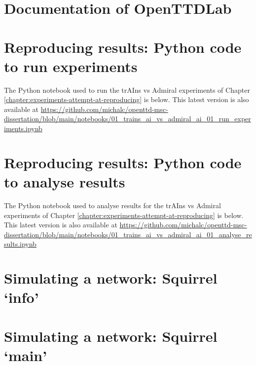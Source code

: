 \documentclass[logo,msc,dsti]{style/infthesis}    %
\begin{document}
{\chapter{Documentation of OpenTTDLab}
\label{chapter:openttdlab-documentation}



\chapter{Reproducing results: Python code to run experiments}
\label{chapter:trains-vs-admiral-run-experiments}

The Python notebook used to run the trAIns vs Admiral experiments of Chapter \ref{chapter:experiments-attempt-at-reproducing} is below. This latest version is also available at \url{https://github.com/michalc/openttd-msc-dissertation/blob/main/notebooks/01_trains_ai_vs_admiral_ai_01_run_experiments.ipynb}



\chapter{Reproducing results: Python code to analyse results}
\label{chapter:trains-vs-admiral-analyse-results}

The Python notebook used to analyse results for the trAIns vs Admiral experiments of Chapter \ref{chapter:experiments-attempt-at-reproducing} is below. This latest version is also available at \url{https://github.com/michalc/openttd-msc-dissertation/blob/main/notebooks/01_trains_ai_vs_admiral_ai_01_analyse_results.ipynb}



\chapter{Simulating a network: Squirrel `info'}
\label{chapter:simulating-a-network-squirrel-info}



\chapter{Simulating a network: Squirrel `main'}
\label{chapter:simulating-a-network-squirrel-main}

}
\end{document}
